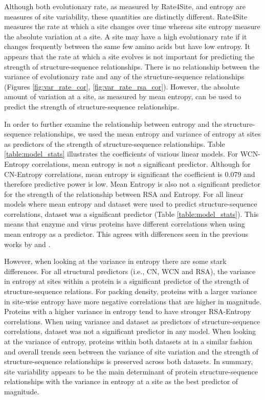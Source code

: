\documentclass[12pt]{article}
\begin{document}
\indent Although both evolutionary rate, as measured by Rate4Site, and entropy are measures of site variability, these quantities are distinctly different. Rate4Site measures the rate at which a site changes over time whereas site entropy measure the absolute variation at a site. A site may have a high evolutionary rate if it changes frequently between the same few amino acids but have low entropy. It appears that the rate at which a site evolves is not important for predicting the strength of structure-sequence relationships. There is no relationship between the variance of evolutionary rate and any of the structure-sequence relationships (Figures \ref{fig:var_rate_cor}, \ref{fig:var_rate_rsa_cor}). However, the absolute amount of variation at a site, as measured by mean entropy, can be used to predict the strength of structure-sequence relationships.

\indent In order to further examine the relationship between entropy and the structure-sequence relationships, we used the mean entropy and variance of entropy at sites as predictors of the strength of structure-sequence relationships. Table \ref{table:model_stats} illustrates the coefficients of various linear models. For WCN-Entropy correlations, mean entropy is not a significant predictor. Although for CN-Entropy correlations, mean entropy is significant the coefficient is 0.079 and therefore predictive power is low. Mean Entropy is also not a significant predictor for the strength of the relationship between RSA and Entropy. For all linear models where mean entropy and dataset were used to predict structure-sequence correlations, dataset was a significant predictor (Table \ref{table:model_stats}). This means that enzyme and virus proteins have different correlations when using mean entropy as a predictor. This agrees with differences seen in the previous works by \cite{Yehetal2014a} and \cite{Shahmoradietal2014}.

\indent However, when looking at the variance in entropy there are some stark differences. For all structural predictors (i.e., CN, WCN and RSA), the variance in entropy at sites within a protein is a significant predictor of the strength of structure-sequence relations. For packing density, proteins with a larger variance in site-wise entropy have more negative correlations that are higher in magnitude. Proteins with a higher variance in entropy tend to have stronger RSA-Entropy correlations. When using variance and dataset as predictors of structure-sequence correlations, dataset was not a significant predictor in any model. When looking at the variance of entropy, proteins within both datasets at in a similar fashion and overall trends seen between the variance of site variation and the strength of structure-sequence relationships is preserved across both datasets. In summary, site variability appears to be the main determinant of protein structure-sequence relationships with the variance in entropy at a site as the best predictor of magnitude.
\end{document}
